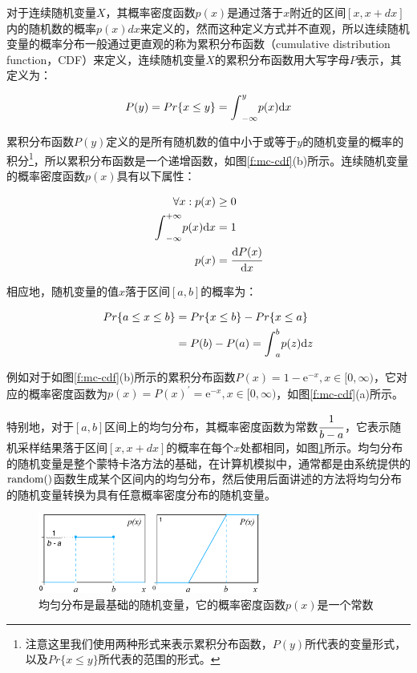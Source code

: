 对于连续随机变量$X$，其概率密度函数$p(x)$是通过落于$x$附近的区间$[x,x+dx]$内的随机数的概率$p(x)dx$来定义的，然而这种定义方式并不直观，所以连续随机变量的概率分布一般通过更直观的称为累积分布函数（cumulative distribution function，CDF）来定义，连续随机变量$X$的累积分布函数用大写字母$P$表示，其定义为：

\begin{equation}
	P(y)=Pr\{x\leq y\}={\rm \int}_{-\infty}^{y}p(x){\rm d}x
\end{equation}

累积分布函数$P(y)$定义的是所有随机数的值中小于或等于$y$的随机变量的概率的积分\footnote{注意这里我们使用两种形式来表示累积分布函数，$P(y)$所代表的变量形式，以及$Pr\{x\leq y \}$所代表的范围的形式。}，所以累积分布函数是一个递增函数，如图\ref{f:mc-cdf}(b)所示。连续随机变量的概率密度函数$p(x)$具有以下属性：

\begin{equation}\label{eq:mc-continuous-pdf}
	\begin{aligned}
		\forall x: p(x)&\geq 0\\
		{\rm \int}_{-\infty}^{+\infty}p(x){\rm d}x&=1\\
		p(x)&= \cfrac{{\rm d}P(x)}{{\rm d}x}
	\end{aligned}
\end{equation}

\noindent 相应地，随机变量的值$x$落于区间$[a,b]$的概率为：

\begin{equation}
	\begin{aligned}
		Pr\{a\leq x\leq b\}&=Pr\{x\leq b\}-Pr\{x\leq a\}\\
		&=P(b)-P(a)={\rm \int}_{a}^{b}p(z){\rm d}z
	\end{aligned}
\end{equation} 

例如对于如图\ref{f:mc-cdf}(b)所示的累积分布函数$P(x)=1-\mathrm{e}^{-x},x\in[0,\infty)$，它对应的概率密度函数为$p(x)=P(x)^{'}=\mathrm{e}^{-x},x\in[0,\infty)$，如图\ref{f:mc-cdf}(a)所示。

特别地，对于$[a,b]$区间上的均匀分布，其概率密度函数为常数$ \cfrac{1}{b-a}$，它表示随机采样结果落于区间$[x,x+dx]$的概率在每个$x$处都相同，如图\ref{f:mc-uniform-cdf}所示。均匀分布的随机变量是整个蒙特卡洛方法的基础，在计算机模拟中，通常都是由系统提供的${\rm random}()$函数生成某个区间内的均匀分布，然后使用后面讲述的方法将均匀分布的随机变量转换为具有任意概率密度分布的随机变量。

\begin{figure}
\sidecaption
		\includegraphics[width=0.65\textwidth]{figures/mc/uniform-cdf}
	\caption{均匀分布是最基础的随机变量，它的概率密度函数$p(x)$是一个常数}
	\label{f:mc-uniform-cdf}
\end{figure}





